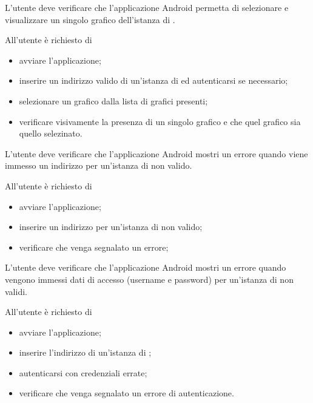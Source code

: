 	L'utente deve verificare che l'applicazione Android permetta di selezionare e visualizzare un singolo grafico dell'istanza di \projectname{}.

		All'utente è richiesto di
		\begin{itemize}
			\item avviare l'applicazione;
			\item inserire un indirizzo valido di un'istanza di \projectname{} ed autenticarsi se necessario;
			\item selezionare un grafico dalla lista di grafici presenti;
			\item verificare visivamente la presenza di un singolo grafico e che quel grafico sia quello selezinato.
		\end{itemize}

	L'utente deve verificare che l'applicazione Android mostri un errore quando viene immesso un indirizzo per un'istanza di \projectname{} non valido.

		All'utente è richiesto di
		\begin{itemize}
			\item avviare l'applicazione;
			\item inserire un indirizzo per un'istanza di \projectname{} non valido;
			\item verificare che venga segnalato un errore;
		\end{itemize}

	L'utente deve verificare che l'applicazione Android mostri un errore quando vengono immessi dati di accesso (username e password) per un'istanza di \projectname{} non validi.

		All'utente è richiesto di
		\begin{itemize}
			\item avviare l'applicazione;
			\item inserire l'indirizzo di un'istanza di \projectname{};
			\item autenticarsi con credenziali errate;
			\item verificare che venga segnalato un errore di autenticazione.
		\end{itemize}